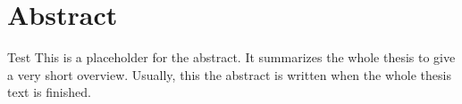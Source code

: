 

\chapter*{Abstract}
\label{cha:abstract}

Test
This is a placeholder for the abstract. It summarizes the whole thesis
to give a very short overview. Usually, this the abstract is written
when the whole thesis text is finished.

